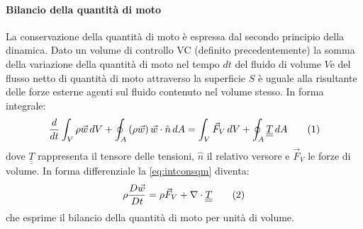 \paragraph{Bilancio della quantità di moto}
La conservazione della quantità di moto è espressa dal secondo principio della dinamica. Dato un volume di controllo VC (definito precedentemente) la somma della variazione  della quantità di moto nel tempo \(dt\) del fluido di volume \(V\)e del flusso netto di quantità di moto attraverso la superficie \(S\) è uguale alla risultante delle forze esterne agenti sul fluido contenuto nel volume stesso.
In forma integrale:
\[\frac{d}{dt} \int_V \rho \vec w \, dV + \oint_A \left( \rho \vec w \right) \vec w \cdot \hat n \, dA = \int_V \vec F_V \, dV + \oint_A \underline{\underline T }\,dA \addtag \label{eq:intconsqm} \]
dove \(\underline{\underline T }\) rappresenta il tensore delle tensioni, \(\hat n\) il relativo versore e \(\vec F_V\) le forze di volume. In forma differenziale la \eqref{eq:intconsqm} diventa:
\[\rho \frac{D \vec w}{Dt} = \rho \vec F_V + \nabla \cdot \underline{\underline T } \addtag \]
che esprime il bilancio della quantità di moto per unità di volume.

